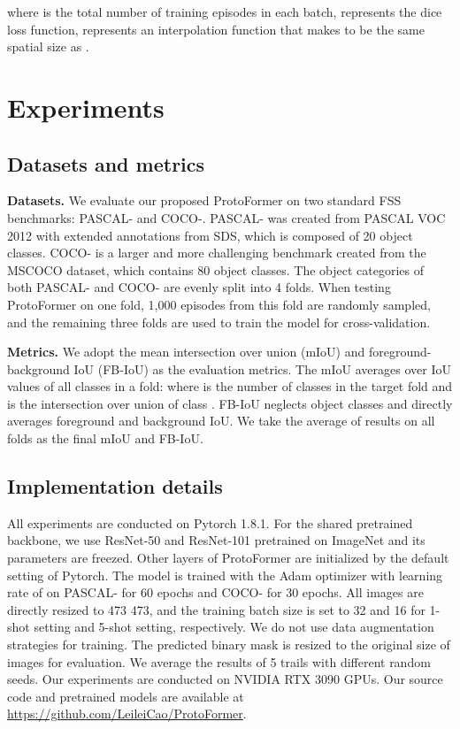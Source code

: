 \documentclass[journal]{IEEEtran}
\begin{document}
where  is the total number of training episodes in each batch,  represents the dice loss function,  represents an interpolation function that makes  to be the same spatial size as .

\section{Experiments}
\subsection{Datasets and metrics}
\noindent \textbf{Datasets.}
We evaluate our proposed ProtoFormer on two standard FSS benchmarks: PASCAL-\cite{shaban} and COCO-\cite{Nguyen_2019_ICCV}. PASCAL- was created from PASCAL VOC 2012\cite{pascal} with extended annotations from SDS\cite{sds}, which is composed of 20 object classes. COCO- is a larger and more challenging benchmark created from the MSCOCO dataset\cite{coco}, which contains 80 object classes. The object categories of both PASCAL- and COCO- are evenly split into 4 folds. When testing ProtoFormer on one fold, 1,000 episodes from this fold are randomly sampled, and the remaining three folds are used to train the model for cross-validation. 

\noindent \textbf{Metrics.}
We adopt the mean intersection over union (mIoU) and foreground-background IoU (FB-IoU) as the evaluation metrics. The mIoU averages over IoU values of all classes in a fold:  where  is the number of classes in the target fold and  is the intersection over union of class . FB-IoU neglects object classes and directly averages foreground and background IoU. We take the average of results on all folds as the final mIoU and FB-IoU.

\subsection{Implementation details}
All experiments are conducted on Pytorch 1.8.1. For the shared pretrained backbone, we use ResNet-50 and ResNet-101 pretrained on ImageNet and its parameters are freezed. Other layers of ProtoFormer are initialized by the default setting of Pytorch. The model is trained with the Adam optimizer with learning rate of  on PASCAL- for 60 epochs and COCO- for 30 epochs. All images are directly resized to 473 473, and the training batch size is set to 32 and 16 for 1-shot setting and 5-shot setting, respectively. We do not use data augmentation strategies for training. The predicted binary mask is resized to the original size of images for evaluation. We average the results of 5 trails with different random seeds. Our experiments are conducted on NVIDIA RTX 3090 GPUs. Our source code and pretrained models are available at \url{https://github.com/LeileiCao/ProtoFormer}.
\end{document}
